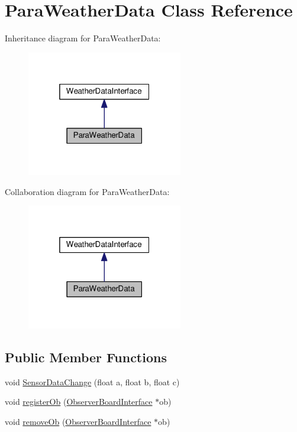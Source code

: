 \hypertarget{classParaWeatherData}{}\section{Para\+Weather\+Data Class Reference}
\label{classParaWeatherData}


Inheritance diagram for Para\+Weather\+Data\+:
\nopagebreak
\begin{figure}[H]
\begin{center}
\leavevmode
\includegraphics[width=193pt]{classParaWeatherData__inherit__graph}
\end{center}
\end{figure}


Collaboration diagram for Para\+Weather\+Data\+:
\nopagebreak
\begin{figure}[H]
\begin{center}
\leavevmode
\includegraphics[width=193pt]{classParaWeatherData__coll__graph}
\end{center}
\end{figure}
\subsection*{Public Member Functions}
\begin{DoxyCompactItemize}
\item 
void \hyperlink{classParaWeatherData_a53f58e23b6b2b8b7267fafdd0059bdc6}{Sensor\+Data\+Change} (float a, float b, float c)
\item 
void \hyperlink{classParaWeatherData_a97816831a5acc55f92e1ef3712d1ab37}{register\+Ob} (\hyperlink{classObserverBoardInterface}{Observer\+Board\+Interface} $\ast$ob)
\item 
void \hyperlink{classParaWeatherData_aea026913d5139b73aa5a7e9254d5f251}{remove\+Ob} (\hyperlink{classObserverBoardInterface}{Observer\+Board\+Interface} $\ast$ob)
\end{DoxyCompactItemize}
